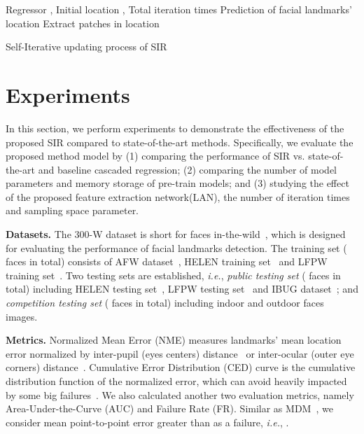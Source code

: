 \documentclass[letterpaper]{article} \usepackage{aaai18}  \usepackage{times}  \usepackage{helvet}  \usepackage{courier}  \usepackage{url}  \usepackage{graphicx}
\def\ie{{\em i.e.}}
\begin{document}
\begin{algorithm}[h]
\begin{algorithmic}[1]
\REQUIRE Regressor , Initial location , Total iteration times 
\ENSURE Prediction of facial landmarks' location 
\STATE Extract patches  in location \;
\STATE \;
\ENDFOR
\end{algorithmic}
\caption{Self-Iterative updating process of SIR}
\label{alg:testing}
\end{algorithm}

\section{Experiments}\label{sec:experiment}
In this section, we perform experiments to demonstrate the effectiveness of the proposed SIR compared to state-of-the-art methods. Specifically, we evaluate the proposed method model by (1) comparing the performance of SIR vs. state-of-the-art and baseline cascaded regression; (2) comparing the number of model parameters and memory storage of pre-train models; and (3) studying the effect of the proposed feature extraction network(LAN), the number of iteration times and sampling space parameter.

{\noindent \textbf{Datasets.}} The 300-W dataset is short for  faces in-the-wild~\cite{300W}, which is designed for evaluating the performance of facial landmarks detection. The training set ( faces in total) consists of AFW dataset~\cite{Ramanan:AFW:2012}, HELEN training set~\cite{Helen:2012} and LFPW training set~\cite{Belhumeur:2011:LFPW}. Two testing sets are established, \ie, \textit{public testing set} ( faces in total) including HELEN testing set~\cite{Helen:2012}, LFPW testing set~\cite{Belhumeur:2011:LFPW} and IBUG dataset~\cite{300W}; and \textit{competition testing set} ( faces in total) including  indoor and  outdoor faces images.

{\noindent \textbf{Metrics.}} Normalized Mean Error (NME) measures landmarks' mean location error normalized by inter-pupil (eyes centers) distance~\cite{Zhu:CFSS:CVPR2015,ShaoqinRen:LBF:CVPR2014} or inter-ocular (outer eye corners) distance~\cite{Trigeorgis:MDM:CVPR16}. Cumulative Error Distribution (CED) curve is the cumulative distribution function of the normalized error, which can avoid heavily impacted by some big failures~\cite{survey:corr:YangJLR15}. We also calculated another two evaluation metrics, namely Area-Under-the-Curve (AUC) and Failure Rate (FR). Similar as MDM~\cite{Trigeorgis:MDM:CVPR16}, we consider mean point-to-point error greater than  as a failure, \ie, .
\end{document}
